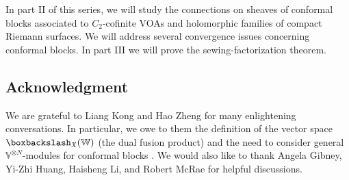 \documentclass[11pt,b5paper,notitlepage]{article}
\theoremstyle{definition}
\theoremstyle{plain}
\newcommand{\Vbb}{\mathbb V}
\newcommand{\Wbb}{\mathbb W}
\newcommand{\<}{\left\langle}
\renewcommand{\>}{\right\rangle}
\newcommand{\fx}{\mathfrak{X}}
\newcommand{\bbs}{\boxbackslash}
\numberwithin{equation}{section}
\begin{document}
In part II of this series, we will study the connections on sheaves of conformal blocks associated to $C_2$-cofinite VOAs and holomorphic families of compact Riemann surfaces. We will address several convergence issues concerning conformal blocks. In part III we will prove the sewing-factorization theorem.


\subsection*{Acknowledgment}


We are grateful to Liang Kong and Hao Zheng for many enlightening conversations. In particular, we owe to them the definition of the vector space $\bbs_\fx(\Wbb)$ (the dual fusion product) and the need to consider general $\Vbb^{\otimes N}$-modules for conformal blocks \cite{KZ-conformal-block}. We would also like to thank Angela Gibney, Yi-Zhi Huang, Haisheng Li, and Robert McRae for helpful discussions.
\end{document}
